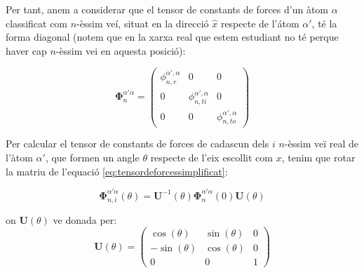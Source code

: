 \documentclass[12pt]{article} %
\let\vec\mathbf %
\begin{document}

Per tant, anem a considerar que el tensor de constants de forces  d'un àtom $\alpha$ classificat com $n$-èssim veí, situat en la direcció $\hat x$ respecte de l'átom  $\alpha'$, té la forma diagonal (notem que en la xarxa real que estem estudiant no té perque haver cap $n$-èssim vei en aquesta posició):

\begin{equation}
\vec\Phi_n^{\alpha'\alpha}=\begin{pmatrix}
\phi_{n,r}^{\alpha',\alpha}&0 &0\\
0& \phi_{n,ti}^{\alpha',\alpha} & 0 \\
0 & 0 & \phi_{n,to}^{\alpha',\alpha}
\end{pmatrix}
\label{eq:tensordeforcessimplificat}
\end{equation}

Per calcular el tensor de constants de forces de cadascun dels $i$ $n$-èssim veï real de l'àtom $\alpha'$, que formen un angle $\theta$ respecte de l'eix escollit com $x$, tenim que rotar la matriu de l'equació \ref{eq:tensordeforcessimplificat}:

\begin{equation}
 \vec\Phi_{n,i}^{\alpha'\alpha}(\theta)=\vec U^{-1}(\theta)\vec\Phi_n^{\alpha'\alpha}(0)\vec U(\theta)
\end{equation}


on $\vec U(\theta)$ ve donada per:
\begin{equation}
\vec U(\theta)=
\begin{pmatrix}
\cos(\theta)  & \sin(\theta) & 0 \\
-\sin(\theta) & \cos(\theta) & 0  \\
0             & 0            & 1
\end{pmatrix}
\end{equation}
\end{document}
